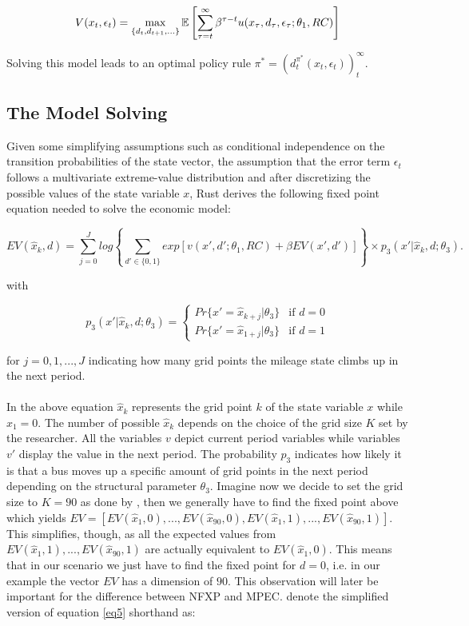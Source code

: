 \begin{equation}
V(x_t, \epsilon_t) = \max_{\{d_t, d_{t+1}, ... \}} \operatorname*{\mathbb{E}} \left[\sum_{\tau=t}^{\infty} \beta^{\tau - t} u(x_\tau, d_\tau, \epsilon_\tau; \theta_1, RC)\right]
\end{equation}

Solving this model leads to an optimal policy rule $\pi^* = (d^{\pi^*}_t(x_t, \epsilon_t))^\infty_t$.

\subsection{The Model Solving}
Given some simplifying assumptions such as conditional independence on the transition probabilities of the state vector, the assumption that the error term $\epsilon_t$ follows a multivariate extreme-value distribution and after discretizing the possible values of the state variable $x$, Rust derives the following fixed point equation needed to solve the economic model:

\begin{equation}
	\label{eq5}
	EV(\hat x_k, d) = \sum_{j=0}^{J} log \left\{ \sum_{d'\in\{0, 1\}}  exp[v(x', d'; \theta_1, RC) + \beta EV(x', d')]\right\} \times p_3(x'|\hat x_k, d; \theta_3). 
\end{equation}

with

\[p_3(x'|\hat x_k, d; \theta_3) = \left\{
\begin{array}{lr}
	Pr\{x'=\hat x_{k+j}|\theta_3\}  & \mbox{if } d = 0 \\
	Pr\{x'=\hat x_{1+j}|\theta_3\} & \mbox{if } d = 1
\end{array}
\right.
\]

for $j=0, 1, ..., J$ indicating how many grid points the mileage state climbs up in the next period. \paragraph{}

In the above equation $\hat x_k$ represents the grid point $k$ of the state variable $x$ while $\hat x_1 = 0$. The number of possible $\hat x_k$ depends on the choice of the grid size $K$ set by the researcher. All the variables $v$ depict current period variables while variables $v'$ display the value in the next period. The probability $p_3$ indicates how likely it is that a bus moves up a specific amount of grid points in the next period depending on the structural parameter $\theta_3$. Imagine now we decide to set the grid size to $K=90$ as done by \cite{Rust.1987}, then we generally have to find the fixed point above which yields $EV = [EV(\hat x_1, 0), ..., EV(\hat x_{90}, 0), EV(\hat x_1, 1), ..., EV(\hat x_{90}, 1)]$. This simplifies, though, as all the expected values from $EV(\hat x_1, 1), ..., EV(\hat x_{90}, 1)$ are actually equivalent to $EV(\hat x_1, 0)$. This means that in our scenario we just have to find the fixed point for $d=0$, i.e. in our example the vector $EV$ has a dimension of $90$. This observation will later be important for the difference between NFXP and MPEC. \cite{Su.Judd.2012} denote the simplified version of equation \ref{eq5} shorthand as:

